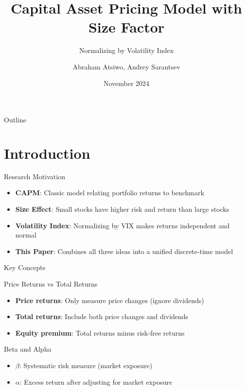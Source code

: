 \documentclass{beamer}
\title{Capital Asset Pricing Model with Size Factor}
\subtitle{Normalizing by Volatility Index}
\author{Abraham Atsiwo, Andrey Sarantsev}
\date{November 2024}
\begin{document}
\maketitle

\begin{frame}{Outline}
\tableofcontents
\end{frame}

\section{Introduction}

\begin{frame}{Research Motivation}
\begin{itemize}
    \item \textbf{CAPM}: Classic model relating portfolio returns to benchmark
    \item \textbf{Size Effect}: Small stocks have higher risk and return than large stocks
    \item \textbf{Volatility Index}: Normalizing by VIX makes returns independent and normal
    \item \textbf{This Paper}: Combines all three ideas into a unified discrete-time model
\end{itemize}
\end{frame}

\begin{frame}{Key Concepts}
\begin{block}{Price Returns vs Total Returns}
\begin{itemize}
    \item \textbf{Price returns}: Only measure price changes (ignore dividends)
    \item \textbf{Total returns}: Include both price changes and dividends
    \item \textbf{Equity premium}: Total returns minus risk-free returns
\end{itemize}
\end{block}

\begin{block}{Beta and Alpha}
\begin{itemize}
    \item $\beta$: Systematic risk measure (market exposure)
    \item $\alpha$: Excess return after adjusting for market exposure
\end{itemize}
\end{block}
\end{frame}
\end{document}
